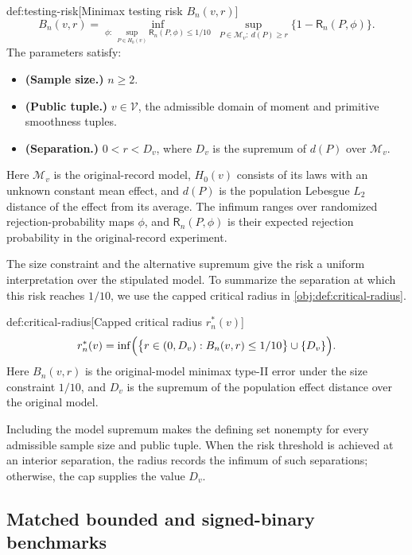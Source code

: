 \begin{definitionv}{def:testing-risk}[Minimax testing risk $B_n(v,r)$]
\[
B_n(v,r)=
\inf_{\phi:\ \sup_{P\in H_0(v)}\mathsf R_n(P,\phi)\le 1/10}
\ \sup_{P\in\mathcal M_v:\ d(P)\ge r}
\bigl\{1-\mathsf R_n(P,\phi)\bigr\}.
\]
The parameters satisfy:
\begin{itemize}
\item \textbf{(Sample size.)} \(n\ge 2\).
\item \textbf{(Public tuple.)} \(v\in\mathcal V\), the admissible domain of moment and primitive smoothness tuples.
\item \textbf{(Separation.)} \(0<r<D_v\), where \(D_v\) is the supremum of \(d(P)\) over \(\mathcal M_v\).
\end{itemize}
Here \(\mathcal M_v\) is the original-record model, \(H_0(v)\) consists of its laws with an unknown constant mean effect, and \(d(P)\) is the population Lebesgue \(L_2\) distance of the effect from its average. The infimum ranges over randomized rejection-probability maps \(\phi\), and \(\mathsf R_n(P,\phi)\) is their expected rejection probability in the original-record experiment.
\end{definitionv}

The size constraint and the alternative supremum give the risk a uniform interpretation over the stipulated model. To summarize the separation at which this risk reaches \(1/10\), we use the capped critical radius  in \cref{obj:def:critical-radius}.

\begin{definitionv}{def:critical-radius}[Capped critical radius $r_n^*(v)$]
\[
r_n^*(v)=
\inf\Bigl(
\bigl\{r\in(0,D_v):B_n(v,r)\le 1/10\bigr\}
\cup\{D_v\}
\Bigr).
\]
Here \(B_n(v,r)\) is the original-model minimax type-II error under the size constraint \(1/10\), and \(D_v\) is the supremum of the population effect distance over the original model.
\end{definitionv}

Including the model supremum makes the defining set nonempty for every admissible sample size and public tuple. When the risk threshold is achieved at an interior separation, the radius records the infimum of such separations; otherwise, the cap supplies the value \(D_v\).

\subsection{Matched bounded and signed-binary benchmarks}

